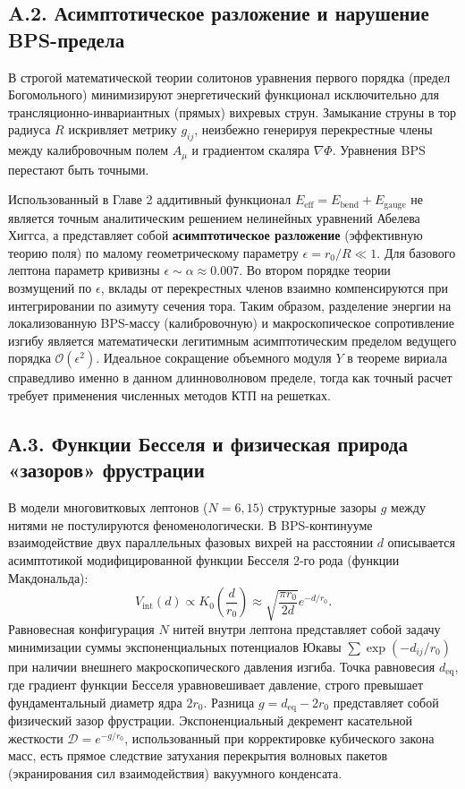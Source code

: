 \documentclass[11pt,a4paper]{article}
\begin{document}
	\subsection*{A.2. Асимптотическое разложение и нарушение BPS-предела}
	В строгой математической теории солитонов уравнения первого порядка (предел Богомольного) минимизируют энергетический функционал исключительно для трансляционно-инвариантных (прямых) вихревых струн. Замыкание струны в тор радиуса $R$ искривляет метрику $g_{ij}$, неизбежно генерируя перекрестные члены между калибровочным полем $A_\mu$ и градиентом скаляра $\nabla \Phi$. Уравнения BPS перестают быть точными.
	
	Использованный в Главе 2 аддитивный функционал $E_{\text{eff}} = E_{\text{bend}} + E_{\text{gauge}}$ не является точным аналитическим решением нелинейных уравнений Абелева Хиггса, а представляет собой \textbf{асимптотическое разложение} (эффективную теорию поля) по малому геометрическому параметру $\epsilon = r_0 / R \ll 1$.
	Для базового лептона параметр кривизны $\epsilon \sim \alpha \approx 0.007$. Во втором порядке теории возмущений по $\epsilon$, вклады от перекрестных членов взаимно компенсируются при интегрировании по азимуту сечения тора. Таким образом, разделение энергии на локализованную BPS-массу (калибровочную) и макроскопическое сопротивление изгибу является математически легитимным асимптотическим пределом ведущего порядка $\mathcal{O}(\epsilon^2)$. Идеальное сокращение объемного модуля $Y$ в теореме вириала справедливо именно в данном длинноволновом пределе, тогда как точный расчет требует применения численных методов КТП на решетках.
	
	\subsection*{А.3. Функции Бесселя и физическая природа «зазоров» фрустрации}
	В модели многовитковых лептонов ($N=6, 15$) структурные зазоры $g$ между нитями не постулируются феноменологически. В BPS-континууме взаимодействие двух параллельных фазовых вихрей на расстоянии $d$ описывается асимптотикой модифицированной функции Бесселя 2-го рода (функции Макдональда):
	\begin{equation}
		V_{\text{int}}(d) \propto K_0\left(\frac{d}{r_0}\right) \approx \sqrt{\frac{\pi r_0}{2d}} e^{-d/r_0}.
	\end{equation}
	Равновесная конфигурация $N$ нитей внутри лептона представляет собой задачу минимизации суммы экспоненциальных потенциалов Юкавы $\sum \exp(-d_{ij}/r_0)$ при наличии внешнего макроскопического давления изгиба. Точка равновесия $d_{\text{eq}}$, где градиент функции Бесселя уравновешивает давление, строго превышает фундаментальный диаметр ядра $2r_0$. 
	Разница $g = d_{\text{eq}} - 2r_0$ представляет собой физический зазор фрустрации. Экспоненциальный декремент касательной жесткости $\mathcal{D} = e^{-g/r_0}$, использованный при корректировке кубического закона масс, есть прямое следствие затухания перекрытия волновых пакетов (экранирования сил взаимодействия) вакуумного конденсата.
	
\end{document}
